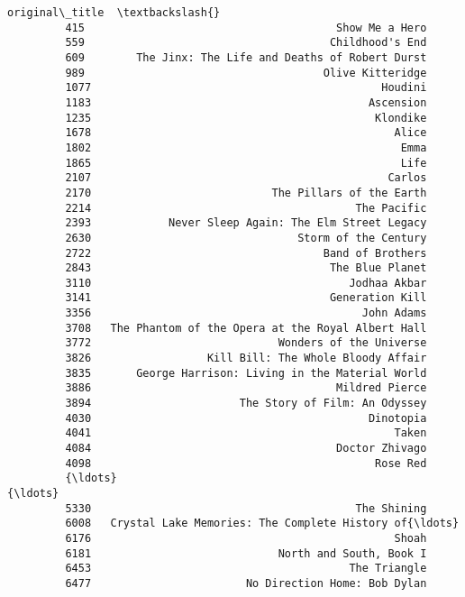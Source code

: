 \documentclass[11pt]{article}
\begin{document}
\begin{Verbatim}[commandchars=\\\{\}]
                                                   original\_title  \textbackslash{}
         415                                       Show Me a Hero   
         559                                      Childhood's End   
         609        The Jinx: The Life and Deaths of Robert Durst   
         989                                     Olive Kitteridge   
         1077                                             Houdini   
         1183                                           Ascension   
         1235                                            Klondike   
         1678                                               Alice   
         1802                                                Emma   
         1865                                                Life   
         2107                                              Carlos   
         2170                            The Pillars of the Earth   
         2214                                         The Pacific   
         2393            Never Sleep Again: The Elm Street Legacy   
         2630                                Storm of the Century   
         2722                                    Band of Brothers   
         2843                                     The Blue Planet   
         3110                                        Jodhaa Akbar   
         3141                                     Generation Kill   
         3356                                          John Adams   
         3708   The Phantom of the Opera at the Royal Albert Hall   
         3772                             Wonders of the Universe   
         3826                  Kill Bill: The Whole Bloody Affair   
         3835       George Harrison: Living in the Material World   
         3886                                      Mildred Pierce   
         3894                       The Story of Film: An Odyssey   
         4030                                           Dinotopia   
         4041                                               Taken   
         4084                                      Doctor Zhivago   
         4098                                            Rose Red   
         {\ldots}                                                  {\ldots}   
         5330                                         The Shining   
         6008   Crystal Lake Memories: The Complete History of{\ldots}   
         6176                                               Shoah   
         6181                             North and South, Book I   
         6453                                        The Triangle   
         6477                        No Direction Home: Bob Dylan   

\end{Verbatim}
\end{document}
